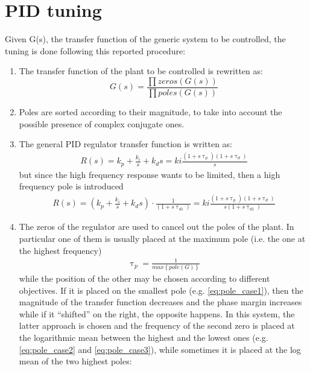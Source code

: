 \newpage
\section{PID tuning}\label{sec:e_pid_tuning}
 Given G(s), the transfer function of the generic system to be controlled, the tuning is done following this reported procedure:
 \begin{enumerate}
    \item The transfer function of the plant to be controlled is rewritten as:
    \begin{equation}
        G(s) = \frac{\prod zeros(G(s))}{\prod poles(G(s))}
    \end{equation}
    \item Poles are sorted according to their magnitude, to take into account the possible presence of complex conjugate ones. 
    \item The general PID regulator transfer function is written as:
    \begin{gather}
         R(s) = k_p+\frac{k_i}{s}+k_ds=ki\frac{(1+s\uptau_p)(1+s\uptau_d)}{s}
         \label{eq:regulator3}
    \end{gather}
    but since the high frequency response wants to be limited, then a high frequency pole is introduced
    \begin{gather}
         R(s) = \left(k_p+\frac{k_i}{s}+k_ds\right)\cdot \frac{1}{(1+s\uptau_{d1})} = ki\frac{(1+s\uptau_p)(1+s\uptau_d)}{s(1+s\uptau_{d1})}
         \label{eq:regulator4}
    \end{gather}
    \item The zeros of the regulator are used to cancel out the poles of the plant. In particular one of them is usually placed at the maximum pole (i.e. the one at the highest frequency) 
    \begin{gather}
        \uptau_p =\frac{1}{max\left\{pole\left(G\right)\right\}}
    \end{gather}
    while the position of the other may be chosen according to different objectives. If it is placed on the smallest pole (e.g. \autoref{eq:pole_case1}), then the magnitude of the transfer function decreases and the phase margin increases while if it ``shifted'' on the right, the opposite happens. In this system, the latter approach is chosen and the frequency of the second zero is placed at the logarithmic mean between the highest and the lowest ones (e.g. \autoref{eq:pole_case2} and \ref{eq:pole_case3}), while sometimes it is placed at the log mean of the two highest poles:
    \begin{gather}

\end{gather}
\end{enumerate}
